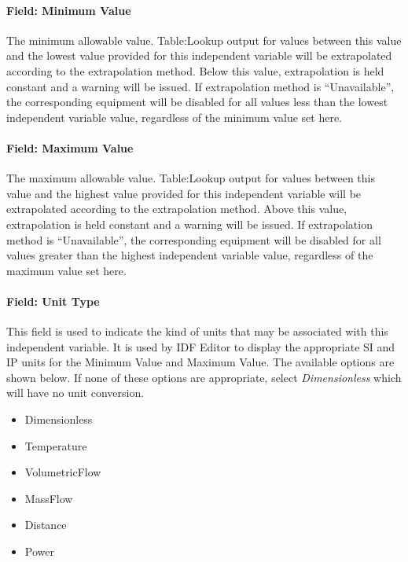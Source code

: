 \paragraph{Field: Minimum Value}\label{field-minimum-value}

The minimum allowable value. Table:Lookup output for values between this
value and the lowest value provided for this independent variable will
be extrapolated according to the extrapolation method. Below this value,
extrapolation is held constant and a warning will be issued. If
extrapolation method is ``Unavailable'', the corresponding equipment
will be disabled for all values less than the lowest independent
variable value, regardless of the minimum value set here.

\paragraph{Field: Maximum Value}\label{field-maximum-value}

The maximum allowable value. Table:Lookup output for values between this
value and the highest value provided for this independent variable will
be extrapolated according to the extrapolation method. Above this value,
extrapolation is held constant and a warning will be issued. If
extrapolation method is ``Unavailable'', the corresponding equipment
will be disabled for all values greater than the highest independent
variable value, regardless of the maximum value set here.

\paragraph{Field: Unit Type}\label{field-unit-type}

This field is used to indicate the kind of units that may be associated
with this independent variable. It is used by IDF Editor to display the
appropriate SI and IP units for the Minimum Value and Maximum Value. The
available options are shown below. If none of these options are
appropriate, select \emph{Dimensionless} which will have no unit
conversion.

\begin{itemize}
\tightlist
\item
Dimensionless
\item
Temperature
\item
VolumetricFlow
\item
MassFlow
\item
Distance
\item
Power
\end{itemize}

